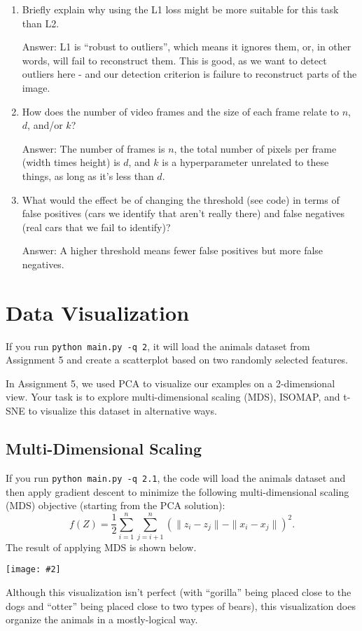 \documentclass{article}
\def\ans#1{\par\gre{Answer: #1}}
\def\gre#1{{\color{gre}#1}}
\def\norm#1{\|#1\|}
\newcommand{\centerfig}[2]{\begin{center}\texttt{[image: \#2]}\end{center}}
\def\enum#1{\begin{enumerate}#1\end{enumerate}}
\begin{document}
\enum{
	\item Briefly explain why using the L1 loss might be more suitable for this task than L2. 
	\ans{L1 is ``robust to outliers'', which means it ignores them, or, in other words, will fail to reconstruct them. This is good, as we want to detect outliers here - and our detection criterion is failure to reconstruct parts of the image.}
	\item How does the number of video frames and the size of each frame relate to $n$, $d$, and/or $k$?
	\ans{The number of frames is $n$, the total number of pixels per frame (width times height) is $d$, and $k$ is a hyperparameter unrelated to these things, as long as it's less than $d$.}
	\item What would the effect be of changing the threshold (see code) in terms of false positives (cars we identify that aren't really there) and false negatives (real cars that we fail to identify)?
	\ans{A higher threshold means fewer false positives but more false negatives.}
}


\section{Data Visualization}

If you run \verb|python main.py -q 2|, it will load the animals dataset from Assignment 5 and create a scatterplot based on two randomly selected features.

In Assignment 5, we used PCA to visualize our examples on a 2-dimensional view. Your task is to explore multi-dimensional scaling (MDS), ISOMAP, and t-SNE to visualize this dataset in alternative ways.

\subsection{Multi-Dimensional Scaling}

If you run \verb|python main.py -q 2.1|, the code will load the animals dataset and then apply gradient descent to minimize the following multi-dimensional scaling (MDS) objective (starting from the PCA solution):
\begin{equation}
\label{eq:MDS}
f(Z) =  \frac{1}{2}\sum_{i=1}^n\sum_{j=i+1}^n (  \norm{z_i - z_j} - \norm{x_i - x_j})^2.
\end{equation}
 The result of applying MDS is shown below.
\centerfig{.5}{../figs/animals_mds_features_warmstart_no.png}
Although this visualization isn't perfect (with ``gorilla'' being placed close to the dogs and ``otter'' being placed close to two types of bears), this visualization does organize the animals in a mostly-logical way.
\end{document}
